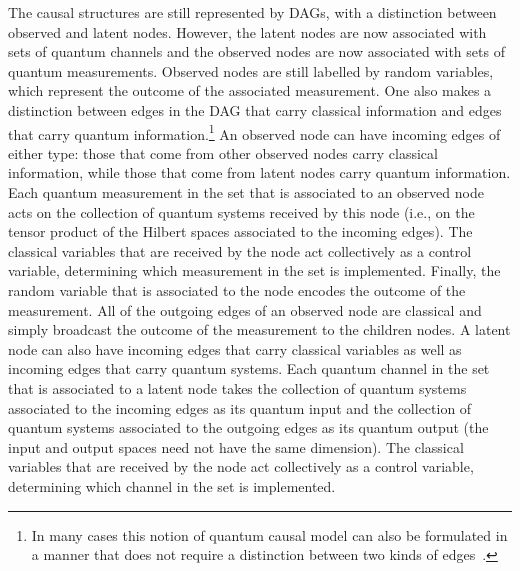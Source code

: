 \documentclass[aps,english,10pt,superscriptaddress,onecolumn,twoside,longbibliography,pra,floatfix,fleqn,nofootinbib]{revtex4-1}%
\theoremstyle{definition}
\begin{document}
The causal structures are still represented by DAGs, with a distinction between observed and latent nodes.  However, the latent nodes are now associated with sets of quantum channels and the observed nodes are now associated with sets of quantum  measurements.  Observed nodes are still labelled by random variables, which represent the outcome of the associated measurement. 
One also makes a distinction between edges in the DAG that carry classical information and edges that carry quantum information.\footnote{In many
cases this notion of quantum causal model can also be formulated in a manner that does not require a distinction between two kinds of edges~\cite{BeyondBellII}.} 
 An observed node can have incoming edges of either type: 
those that come from other observed nodes carry classical information, while those that come from latent nodes carry quantum information.  Each quantum measurement in the set that is associated to an observed node acts on the collection of quantum systems received by this node (i.e., on the tensor product of the Hilbert spaces associated to the incoming edges).  The classical variables that are received by the node act collectively as a control variable, determining which measurement in the set is implemented.  Finally, the random variable that is associated to the node encodes the outcome of the measurement.  All of the outgoing edges of an observed node are classical and simply broadcast the outcome of the measurement to the children nodes. 
%
A latent node can also have incoming edges that carry classical variables as well as incoming edges that carry quantum systems.   Each quantum channel in the set that is associated to a latent node takes the collection of quantum systems associated to the incoming edges as its quantum input and the collection of quantum systems associated to the outgoing edges as its quantum output (the input and output spaces need not have the same dimension).  The classical variables that are received by the node act collectively as a control variable, determining which channel in the set is implemented.
\end{document}
